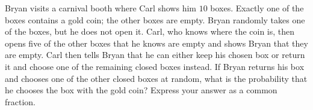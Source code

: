 Bryan visits a carnival booth where Carl shows him $10$ boxes. Exactly one of the boxes contains a gold coin; the other boxes are empty. Bryan randomly takes one of the boxes, but he does not open it. Carl, who knows where the coin is, then opens five of the other boxes that he knows are empty and shows Bryan that they are empty. Carl then tells Bryan that he can either keep his chosen box or return it and choose one of the remaining closed boxes instead. If Bryan returns his box and chooses one of the other closed boxes at random, what is the probability that he chooses the box with the gold coin? Express your answer as a common fraction.
